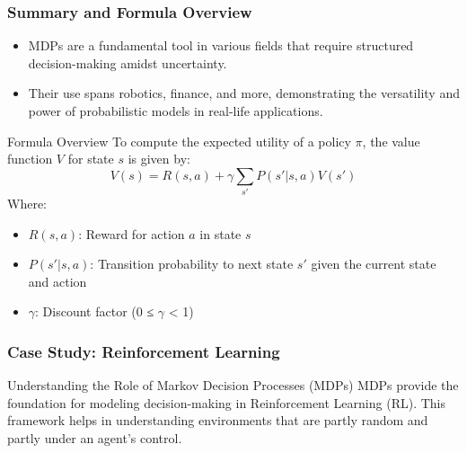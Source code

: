 \documentclass[aspectratio=169]{beamer}
\begin{document}
\begin{frame}[fragile]
  \frametitle{Summary and Formula Overview}
  \begin{itemize}
    \item MDPs are a fundamental tool in various fields that require structured decision-making amidst uncertainty.
    \item Their use spans robotics, finance, and more, demonstrating the versatility and power of probabilistic models in real-life applications.
  \end{itemize}

  \vspace{0.5cm}
  
  \begin{block}{Formula Overview}
    To compute the expected utility of a policy $\pi$, the value function $V$ for state $s$ is given by:
    \begin{equation}
      V(s) = R(s, a) + \gamma \sum_{s'} P(s' | s, a) V(s')
    \end{equation}
    Where:
    \begin{itemize}
      \item $R(s, a)$: Reward for action $a$ in state $s$
      \item $P(s' | s, a)$: Transition probability to next state $s'$ given the current state and action
      \item $\gamma$: Discount factor (0 ≤ $\gamma$ < 1)
    \end{itemize}
  \end{block}
\end{frame}

\begin{frame}[fragile]
    \frametitle{Case Study: Reinforcement Learning}
    \begin{block}{Understanding the Role of Markov Decision Processes (MDPs)}
        MDPs provide the foundation for modeling decision-making in Reinforcement Learning (RL). This framework helps in understanding environments that are partly random and partly under an agent's control.
    \end{block}
\end{frame}
\end{document}

